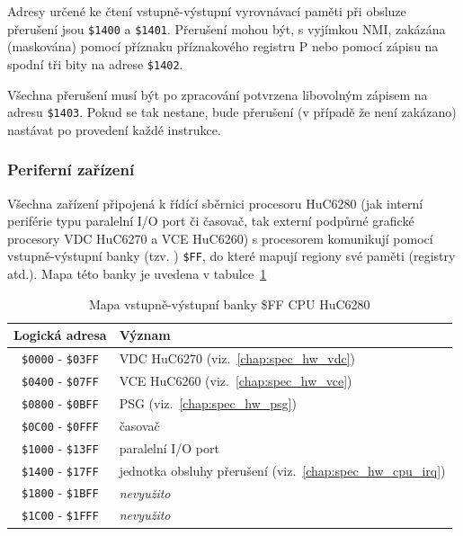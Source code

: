 Adresy určené ke čtení vstupně-výstupní vyrovnávací paměti při obsluze
přerušení jsou {\tt \$1400} a {\tt \$1401}. Přerušení mohou být, s vyjímkou
NMI, zakázána (maskována) pomocí příznaku  příznakového registru {\sf P}
nebo pomocí zápisu na spodní tři bity na adrese {\tt \$1402}.

Všechna přerušení musí být po zpracování potvrzena libovolným zápisem na adresu
{\tt \$1403}. Pokud se tak nestane, bude přerušení (v případě že není zakázano)
nastávat po provedení každé instrukce.


\subsubsection{Periferní zařízení}\label{chap:spec_hw_cpu_peripheral}

Všechna zařízení připojená k řídící sběrnici procesoru HuC6280 (jak interní
periférie typu paralelní I/O port či časovač, tak externí podpůrné grafické
procesory VDC HuC6270 a VCE HuC6260) s procesorem komunikují pomocí
vstupně-výstupní banky (tzv. ) {\tt \$FF}, do které mapují regiony
své paměti (registry atd.). Mapa této banky je uvedena v
tabulce~\ref{tab:cpu_iopage}

\begin{table}[h]
\begin{center}
\begin{tabular}{|c|l|}
\hline
\textbf{Logická adresa} & \textbf{Význam} \\
\hline
{\tt \$0000} - {\tt \$03FF} & VDC HuC6270 (viz.~\ref{chap:spec_hw_vdc}) \\
{\tt \$0400} - {\tt \$07FF} & VCE HuC6260 (viz.~\ref{chap:spec_hw_vce}) \\
{\tt \$0800} - {\tt \$0BFF} & PSG (viz.~\ref{chap:spec_hw_psg}) \\
{\tt \$0C00} - {\tt \$0FFF} & časovač \\
{\tt \$1000} - {\tt \$13FF} & paralelní I/O port \\
{\tt \$1400} - {\tt \$17FF} & jednotka obsluhy přerušení
	(viz.~\ref{chap:spec_hw_cpu_irq}) \\
{\tt \$1800} - {\tt \$1BFF} & {\em nevyužito} \\
{\tt \$1C00} - {\tt \$1FFF} & {\em nevyužito} \\
\hline
\end{tabular}
\end{center}
\caption{Mapa vstupně-výstupní banky \$FF CPU HuC6280\label{tab:cpu_iopage}}
\end{table}

